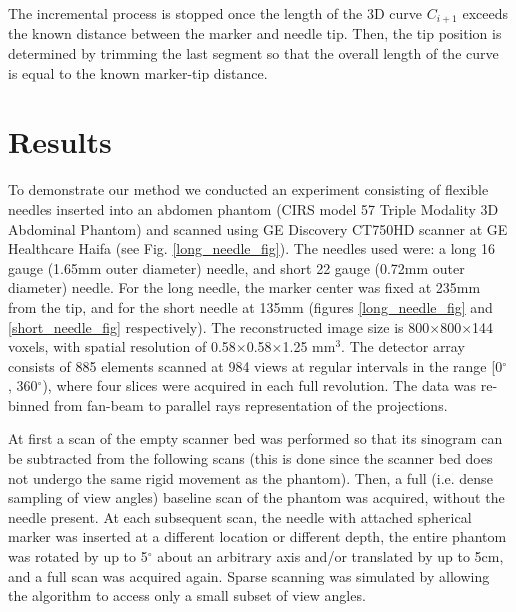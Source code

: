 The incremental process is stopped once the length of the 3D curve $C_{i+1}$ exceeds the known distance between the marker and needle tip. Then, the tip position is determined by trimming the last segment so that the overall length of the curve is equal to the known marker-tip distance.

\section*{Results}

To demonstrate our method we conducted an experiment consisting of flexible needles inserted into an abdomen phantom (CIRS model 57 Triple Modality 3D Abdominal Phantom) and scanned using GE Discovery CT750HD scanner at GE Healthcare Haifa (see Fig. \ref{long_needle_fig}). The needles used were: a long 16 gauge (1.65mm outer diameter) needle, and short 22 gauge (0.72mm outer diameter) needle. For the long needle, the marker center was fixed at 235mm from the tip, and for the short needle at 135mm (figures \ref{long_needle_fig} and \ref{short_needle_fig} respectively).
The reconstructed image size is 800$\times$800$\times$144 voxels, with spatial resolution of 0.58$\times$0.58$\times$1.25 mm$^3$. The detector array consists of 885 elements scanned at 984 views at regular intervals in the range [0$^{\circ}$ , 360$^{\circ}$), where four slices were acquired in each full revolution. The data was re-binned from fan-beam to parallel rays representation of the projections.

At first a scan of the empty scanner bed was performed so that its sinogram can be subtracted from the following scans (this is done since the scanner bed does not undergo the same rigid movement as the phantom). Then, a full (i.e. dense sampling of view angles) baseline scan of the phantom was acquired, without the needle present. At each subsequent scan, the needle with attached spherical marker was inserted at a different location or different depth, the entire phantom was rotated by up to 5$^\circ$ about an arbitrary axis and/or translated by up to 5cm, and a full scan was acquired again. Sparse scanning was simulated by allowing the algorithm to access only a small subset of view angles.



